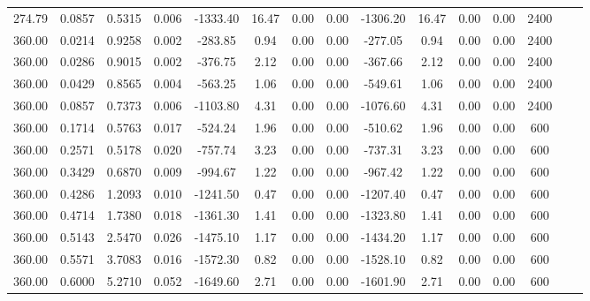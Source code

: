 \documentclass[%
 aip,
 jcp,
 sd,%
 amsmath,amssymb,
]{revtex4-1}
\begin{document}
\begin{table*}[!htbp]
\begin{ruledtabular}
\begin{tabular}{ccccccccccccccc}
274.79	&	0.0857	&	0.5315	&	0.006	&	-1333.40	&	16.47	&	0.00	&	0.00	&	-1306.20	&	16.47	&	0.00	&	0.00	&	2400	\\
360.00	&	0.0214	&	0.9258	&	0.002	&	-283.85	&	0.94	&	0.00	&	0.00	&	-277.05	&	0.94	&	0.00	&	0.00	&	2400	\\
360.00	&	0.0286	&	0.9015	&	0.002	&	-376.75	&	2.12	&	0.00	&	0.00	&	-367.66	&	2.12	&	0.00	&	0.00	&	2400	\\
360.00	&	0.0429	&	0.8565	&	0.004	&	-563.25	&	1.06	&	0.00	&	0.00	&	-549.61	&	1.06	&	0.00	&	0.00	&	2400	\\
360.00	&	0.0857	&	0.7373	&	0.006	&	-1103.80	&	4.31	&	0.00	&	0.00	&	-1076.60	&	4.31	&	0.00	&	0.00	&	2400	\\
360.00	&	0.1714	&	0.5763	&	0.017	&	-524.24	&	1.96	&	0.00	&	0.00	&	-510.62	&	1.96	&	0.00	&	0.00	&	600	\\
360.00	&	0.2571	&	0.5178	&	0.020	&	-757.74	&	3.23	&	0.00	&	0.00	&	-737.31	&	3.23	&	0.00	&	0.00	&	600	\\
360.00	&	0.3429	&	0.6870	&	0.009	&	-994.67	&	1.22	&	0.00	&	0.00	&	-967.42	&	1.22	&	0.00	&	0.00	&	600	\\
360.00	&	0.4286	&	1.2093	&	0.010	&	-1241.50	&	0.47	&	0.00	&	0.00	&	-1207.40	&	0.47	&	0.00	&	0.00	&	600	\\
360.00	&	0.4714	&	1.7380	&	0.018	&	-1361.30	&	1.41	&	0.00	&	0.00	&	-1323.80	&	1.41	&	0.00	&	0.00	&	600	\\
360.00	&	0.5143	&	2.5470	&	0.026	&	-1475.10	&	1.17	&	0.00	&	0.00	&	-1434.20	&	1.17	&	0.00	&	0.00	&	600	\\
360.00	&	0.5571	&	3.7083	&	0.016	&	-1572.30	&	0.82	&	0.00	&	0.00	&	-1528.10	&	0.82	&	0.00	&	0.00	&	600	\\
360.00	&	0.6000	&	5.2710	&	0.052	&	-1649.60	&	2.71	&	0.00	&	0.00	&	-1601.90	&	2.71	&	0.00	&	0.00	&	600	\\
\end{tabular}
\end{ruledtabular}
\end{table*}
\end{document}
